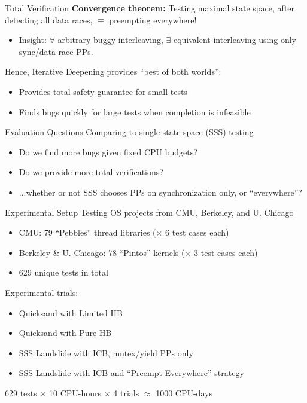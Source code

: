 \documentclass[xcolor=dvipsnames]{beamer}
\begin{document}
\begin{frame}{Total Verification}
	\textbf{Convergence theorem:} Testing maximal state space, after detecting all data races, $\equiv$ preempting everywhere!
	\begin{itemize}
		\item Insight: $\forall$ arbitrary buggy interleaving, $\exists$ equivalent interleaving %
			using only sync/data-race PPs.
	\end{itemize}
	\linegap

	Hence, Iterative Deepening provides ``best of both worlds'':
	\begin{itemize}
		\item Provides total safety guarantee for small tests
		\item Finds bugs quickly for large tests when completion is infeasible
	\end{itemize}
\end{frame}



\begin{frame}{Evaluation Questions}
	Comparing to single-state-space (SSS) testing
	\begin{itemize}
		\item Do we find more bugs given fixed CPU budgets?
		\item Do we provide more total verifications?
		\item ...whether or not SSS chooses PPs on synchronization only, or ``everywhere''?
	\end{itemize}
\end{frame}

\begin{frame}{Experimental Setup}
	Testing OS projects from CMU, Berkeley, and U. Chicago
	\begin{itemize}
		\item CMU: 79 ``Pebbles'' thread libraries ($\times$ 6 test cases each)
		\item Berkeley \& U. Chicago: 78 ``Pintos'' kernels ($\times$ 3 test cases each)
		\item 629 unique tests in total
	\end{itemize}
	\pause
	\linegap
	
	Experimental trials:
	\begin{itemize}
		\item Quicksand with Limited HB
		\item Quicksand with Pure HB
		\item SSS Landslide with ICB, mutex/yield PPs only
		\item SSS Landslide with ICB and ``Preempt Everywhere'' strategy
	\end{itemize}
	\pause
	\linegap

	629 tests $\times$ 10 CPU-hours $\times$ 4 trials $\approx$ 1000 CPU-days
\end{frame}
\end{document}
